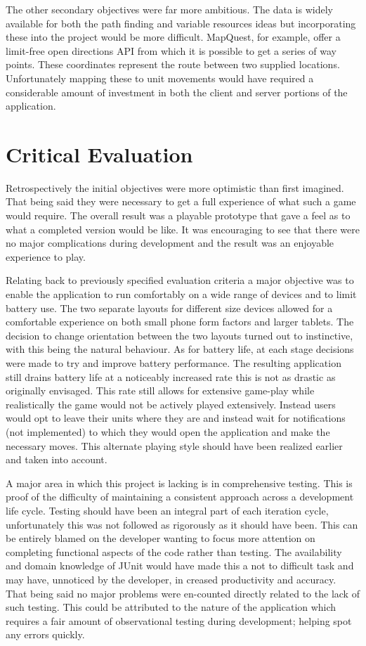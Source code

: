 The other secondary objectives were far more ambitious. The data is widely available for both the path finding and variable resources ideas but incorporating these into the project would be more difficult. MapQuest, for example, offer a limit-free open directions API\cite{mapquest_directions} from which it is possible to get a series of way points. These coordinates represent the route between two supplied locations. Unfortunately mapping these to unit movements would have required a considerable amount of investment in both the client and server portions of the application. 

\section{Critical Evaluation}
Retrospectively the initial objectives were more optimistic than first imagined. That being said they were necessary to get a full experience of what such a game would require. The overall result was a playable prototype that gave a feel as to what a completed version would be like. It was encouraging to see that there were no major complications during development and the result was an enjoyable experience to play.

Relating back to previously specified evaluation criteria a major objective was to enable the application to run comfortably on a wide range of devices and to limit battery use. The two separate layouts for different size devices allowed for a comfortable experience on both small phone form factors and larger tablets. The decision to change orientation between the two layouts turned out to instinctive, with this being the natural behaviour. As for battery life, at each stage decisions were made to try and improve battery performance. The resulting application still drains battery life at a noticeably increased rate this is not as drastic as originally envisaged. This rate still allows for extensive game-play while realistically the game would not be actively played extensively. Instead users would opt to leave their units where they are and instead wait for notifications (not implemented) to which they would open the application and make the necessary moves. This alternate playing style should have been realized earlier and taken into account.

A major area in which this project is lacking is in comprehensive testing. This is proof of the difficulty of maintaining a consistent approach across a development life cycle. Testing should have been an integral part of each iteration cycle, unfortunately this was not followed as rigorously as it should have been. This can be entirely blamed on the developer wanting to focus more attention on completing functional aspects of the code rather than testing. The availability and domain knowledge of JUnit would have made this a not to difficult task and may have, unnoticed by the developer, in creased productivity and accuracy. That being said no major problems were en-counted directly related to the lack of such testing. This could be attributed to the nature of the application which requires a fair amount of observational testing during development; helping spot any errors quickly.


